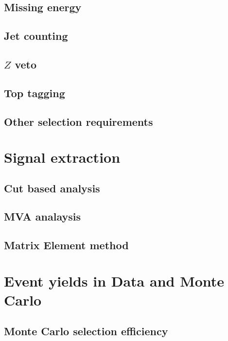 \documentclass{cmspaper}
\begin{document}
  \subsection{Missing energy} 
    \label{sec:sel_met}
%    
  \subsection{Jet counting} 
    \label{sec:sel_jets}
%    
  \subsection{$Z$ veto}
    \label{sec:sel_zveto}
%    
  \subsection{Top tagging}
    \label{sec:sel_toptag}
%    
  \subsection{Other selection requirements}
    \label{sec:sel_other}
%    

\section{Signal extraction}
  \subsection{Cut based analysis}
    \label{sec:anal_cutbased}
%    
  \subsection{MVA analaysis}
    \label{sec:anal_mva}
%    
  \subsection{Matrix Element method}
    \label{sec:anal_me}
%    

\section{Event yields in Data and Monte Carlo}
  \subsection{Monte Carlo selection efficiency}
    \label{sec:mc_eff}
%    
\end{document}

